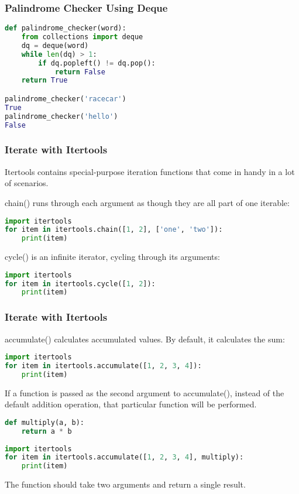 \documentclass{beamer}
\begin{document}
\begin{frame}[fragile]
\frametitle{Palindrome Checker Using Deque}
\begin{lstlisting}[language=Python]
def palindrome_checker(word):
    from collections import deque
    dq = deque(word)
    while len(dq) > 1:
        if dq.popleft() != dq.pop():
            return False
    return True

palindrome_checker('racecar')
True
palindrome_checker('hello')
False
\end{lstlisting}
\end{frame}

\begin{frame}[fragile]
\frametitle{Iterate with Itertools}
Itertools contains special-purpose iteration functions that come in handy in a lot of scenarios.

chain() runs through each argument as though they are all part of one iterable:

\begin{lstlisting}[language=Python]
import itertools
for item in itertools.chain([1, 2], ['one', 'two']):
	print(item)
\end{lstlisting}

cycle() is an infinite iterator, cycling through its arguments:
\begin{lstlisting}[language=Python]
import itertools
for item in itertools.cycle([1, 2]):
    print(item)
\end{lstlisting}

\end{frame}


\begin{frame}[fragile]
\frametitle{Iterate with Itertools}

accumulate() calculates accumulated values. By default, it calculates the sum:

\begin{lstlisting}[language=Python]
import itertools
for item in itertools.accumulate([1, 2, 3, 4]):
    print(item)
\end{lstlisting}

If a function is passed as the second argument to accumulate(), instead of the default addition operation, that particular function will be performed.
\begin{lstlisting}[language=Python]
def multiply(a, b):
    return a * b
    
import itertools
for item in itertools.accumulate([1, 2, 3, 4], multiply):
    print(item)
\end{lstlisting}
The function should take two arguments and return a single result.
\end{frame}

\begin{frame}[fragile]
\frametitle{Print Pretty Statements with pprint())
pprint pretty prints data for us:
\begin{lstlisting}[language=Python]
data = [ (i, { 'a':'A','b':'B','c':'C','d':'D','e':'E'})
         for i in range(3)
         ]
from pprint import pprint

# Check the difference between 
print(data)
pprint(data)
\end{lstlisting}
\end{frame}
\end{document}

